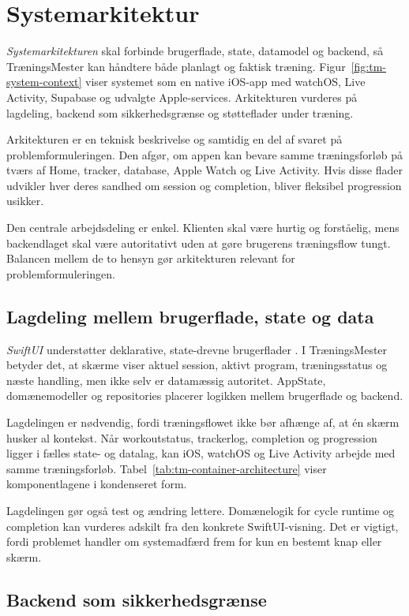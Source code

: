 \section{Systemarkitektur}

\emph{Systemarkitekturen} skal forbinde brugerflade, state, datamodel og backend, så TræningsMester kan håndtere både planlagt og faktisk træning. Figur~\ref{fig:tm-system-context} viser systemet som en native iOS-app med watchOS, Live Activity, Supabase og udvalgte Apple-services. Arkitekturen vurderes på lagdeling, backend som sikkerhedsgrænse og støtteflader under træning.

Arkitekturen er en teknisk beskrivelse og samtidig en del af svaret på problemformuleringen. Den afgør, om appen kan bevare samme træningsforløb på tværs af Home, tracker, database, Apple Watch og Live Activity. Hvis disse flader udvikler hver deres sandhed om session og completion, bliver fleksibel progression usikker.

Den centrale arbejdsdeling er enkel. Klienten skal være hurtig og forståelig, mens backendlaget skal være autoritativt uden at gøre brugerens træningsflow tungt. Balancen mellem de to hensyn gør arkitekturen relevant for problemformuleringen.

\subsection{Lagdeling mellem brugerflade, state og data}

\emph{SwiftUI} understøtter deklarative, state-drevne brugerflader \cite{apple_swiftui_docs}. I TræningsMester betyder det, at skærme viser aktuel session, aktivt program, træningsstatus og næste handling, men ikke selv er datamæssig autoritet. AppState, domænemodeller og repositories placerer logikken mellem brugerflade og backend.

Lagdelingen er nødvendig, fordi træningsflowet ikke bør afhænge af, at én skærm husker al kontekst. Når workoutstatus, trackerlog, completion og progression ligger i fælles state- og datalag, kan iOS, watchOS og Live Activity arbejde med samme træningsforløb. Tabel~\ref{tab:tm-container-architecture} viser komponentlagene i kondenseret form.

Lagdelingen gør også test og ændring lettere. Domænelogik for cycle runtime og completion kan vurderes adskilt fra den konkrete SwiftUI-visning. Det er vigtigt, fordi problemet handler om systemadfærd frem for kun en bestemt knap eller skærm.

\subsection{Backend som sikkerhedsgrænse}

